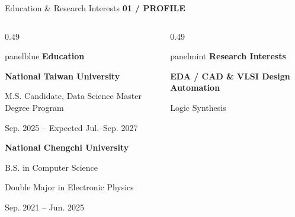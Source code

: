 \documentclass[aspectratio=169,10pt]{beamer}
\newcommand{\smalllabel}[1]{{\scriptsize\bfseries\color{Accent}\MakeUppercase{#1}}}
\newcommand{\slidenavigation}{}
\newcommand{\slideposition}{}
\newcommand{\slidesubtitle}[1]{%
  \smalllabel{#1}%
}
\begin{document}
\renewcommand{\slidenavigation}{\hyperlink{details-index}{\beamerbutton{Details index}}}
\renewcommand{\slideposition}{Summary 2 / 18}
\begin{frame}[label=summary-2]{Education \& Research Interests}
  \vspace{0.05cm}
  \slidesubtitle{01 / Profile}\par\vspace{0.10cm}
  \vfill
  \begin{columns}[T,onlytextwidth]
    \begin{column}{0.49\textwidth}
      \begin{beamercolorbox}[rounded=true,sep=0.20cm,wd=\linewidth]{panelblue}
        {\large\bfseries\color{AccentBlue}Education}\par
        \vspace{0.14cm}
        {\normalsize\bfseries National Taiwan University}\par
        {\normalsize M.S. Candidate, Data Science Master Degree Program}\par
        {\small\color{Muted}Sep. 2025 -- Expected Jul.--Sep. 2027}\par
        \vspace{0.23cm}
        {\normalsize\bfseries National Chengchi University}\par
        {\normalsize B.S. in Computer Science}\par
        {\normalsize Double Major in Electronic Physics}\par
        {\small\color{Muted}Sep. 2021 -- Jun. 2025}
      \end{beamercolorbox}
    \end{column}
    \begin{column}{0.49\textwidth}
      \begin{beamercolorbox}[rounded=true,sep=0.20cm,wd=\linewidth]{panelmint}
        {\large\bfseries\color{Accent}Research Interests}\par
        \vspace{0.15cm}
        {\normalsize\bfseries EDA / CAD \& VLSI Design Automation}\par
        \vspace{0.09cm}
        {\normalsize Logic Synthesis}\par

\end{beamercolorbox}
\end{column}
\end{columns}
\end{frame}
\end{document}
